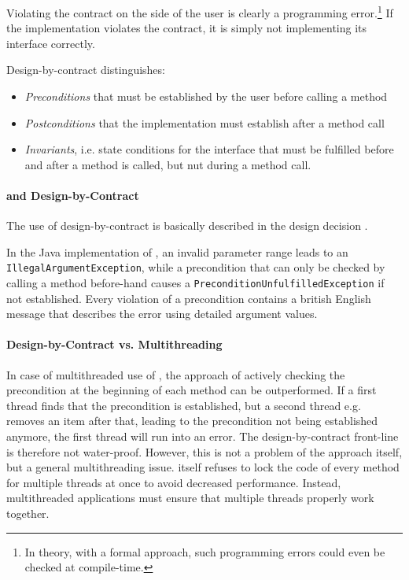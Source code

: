 Violating the contract on the side of the user is clearly a programming error.\footnote{In theory, with a formal approach, such programming errors could even be checked at compile-time.} If the implementation violates the contract, it is simply not implementing its interface correctly.

Design-by-contract distinguishes:
\begin{itemize}
\item \emph{Preconditions} that must be established by the user before calling a method
\item \emph{Postconditions} that the implementation must establish after a method call
\item \emph{Invariants}, i.e. state conditions for the interface that must be fulfilled before and after a method is called, but nut during a method call.
\end{itemize}

\paragraph{\LibName{} and Design-by-Contract}
\label{sec:LibNameDesignByContract}

The use of design-by-contract is basically described in the design decision .

In the Java implementation of \LibName{}, an invalid parameter range leads to an \texttt{IllegalArgumentException}, while a precondition that can only be checked by calling a method before-hand causes a \texttt{PreconditionUnfulfilledException} if not established. Every violation of a precondition contains a british English message that describes the error using detailed argument values.

\paragraph{Design-by-Contract vs. Multithreading}
\label{sec:DbcMultithreading}

In case of multithreaded use of \LibName{}, the approach of actively checking the precondition at the beginning of each method can be outperformed. If a first thread finds that the precondition is established, but a second thread e.g. removes an item after that, leading to the precondition not being established anymore, the first thread will run into an error. The design-by-contract front-line is therefore not water-proof. However, this is not a problem of the approach itself, but a general multithreading issue. \LibName{} itself refuses to lock the code of every method for multiple threads at once to avoid decreased performance. Instead, multithreaded applications must ensure that multiple threads properly work together.

